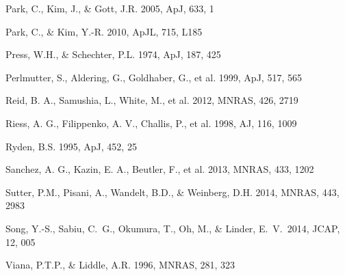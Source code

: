 \documentclass[useAMS,usenatbib]{mn2e}
\begin{document}
\begin{thebibliography}{}
Park, C., Kim, J., \& Gott, J.R. 2005, ApJ, 633, 1  

Park, C., \& Kim, Y.-R. 2010, ApJL, 715, L185  

Press, W.H., \& Schechter, P.L. 1974, ApJ, 187, 425

Perlmutter, S., Aldering, G., Goldhaber, G., et al. 1999, ApJ, 517, 565  

Reid, B. A., Samushia, L., White, M., et al. 2012, MNRAS, 426, 2719  

Riess, A. G., Filippenko, A. V., Challis, P., et al. 1998, AJ, 116, 1009  


Ryden, B.S. 1995, ApJ, 452, 25  


Sanchez, A. G., Kazin, E. A., Beutler, F., et al. 2013, MNRAS, 433, 1202  

Sutter, P.M., Pisani, A., Wandelt, B.D., \& Weinberg, D.H. 2014, MNRAS, 443, 2983

 Song, Y.-S., Sabiu, C.~G., 
Okumura, T., Oh, M., \& Linder, E.~V.\ 2014, JCAP, 12, 005 



Viana, P.T.P., \& Liddle, A.R. 1996, MNRAS, 281, 323


\end{thebibliography}

\bsp

\label{lastpage}
\end{document}
